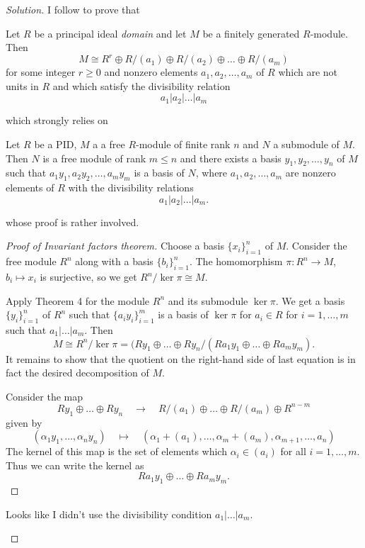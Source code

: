 \begin{proof}[Solution]\leavevmode
	I follow \cite{dummit} to prove that
	 \begin{thm}\leavevmode
		Let $R$ be a principal ideal \textit{domain} and let $M$ be a finitely generated $R$-module. Then 
		\[M\cong  R^r\oplus R/(a_1)\oplus R/(a_2)\oplus \ldots\oplus R/(a_m)\]
		for some integer $r\geq 0$ and nonzero elements $a_1,a_2,\ldots,a_m$ of $R$ which are not units in $R$ and which satisfy the divisibility relation
		\[a_1|a_2|\ldots|a_m\]
	\end{thm}
	which strongly relies on
	\begin{thm}[4]
		Let $R$ be a PID, $M$ a a free $R$-module of finite rank $n$ and $N$ a submodule of $M$. Then $N$ is a free module of rank $m\leq n$ and there exists a basis $y_1,y_2,\ldots,y_n$ of $M$ such that $a_1y_1,a_2y_2,\ldots,a_my_m$ is a basis of $N$, where $a_1,a_2,\ldots,a_m$ are nonzero elements of $R$ with the divisibility relations
		\[a_1|a_2|\ldots|a_m.\]
	\end{thm}
whose proof is rather involved.

\begin{proof}[Proof of Invariant factors theorem]
		Choose a basis $\{x_i\}_{i=1}^n$ of $M$. Consider the free module $R^n$ along with a basis $\{b_i\}_{i=1}^n$. The homomorphism $\pi:R^n\to M$, $b_i\mapsto x_i$ is surjective, so we get $R^n/\ker \pi\cong M$.

		Apply Theorem 4 for the module $R^n$ and its submodule $\ker \pi$. We get a basis $\{y_i\}_{i=1}^n$ of $R^n$ such that $\{a_iy_i\}_{i=1}^m$ is a basis of $\ker \pi$ for $a_i\in R$ for $i=1,\ldots,m$ such that $a_1|\ldots|a_m$. Then
\[M\cong R^n/\ker \pi=(Ry_1\oplus \ldots\oplus Ry_n\Big/(Ra_1y_1\oplus \ldots\oplus Ra_my_m).\]
It remains to show that the quotient on the right-hand side of last equation is in fact the desired decomposition of $M$.

Consider the map
\[Ry_1\oplus \ldots\oplus Ry_n \quad \longrightarrow \quad R/(a_1)\oplus \ldots\oplus R/(a_m)\oplus R^{n-m}\]
given by
\[(\alpha_1y_1,\ldots,\alpha_ny_n)\quad \longmapsto\quad (\alpha_1+(a_1),\ldots,\alpha_m+(a_m),\alpha_{m+1},\ldots,a_n)\]
The kernel of this map is the set of elements which $\alpha_i\in(a_i)$ for all $i=1,\ldots,m$. Thus we can write the kernel as 
\[Ra_1y_1\oplus \ldots\oplus Ra_my_m.\]
	\end{proof}

	\begin{remark}
		Looks like I didn't use the divisibility condition $a_1|\ldots|a_m$.
	\end{remark}


\end{proof}
